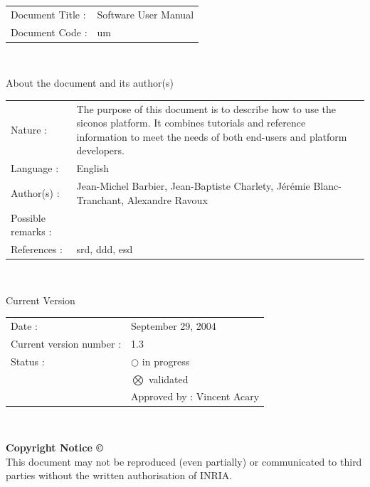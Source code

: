 \noindent\begin{tabular}{|p{}|p{}|}
\hline
Document Title : & \textsf{Software User Manual} \\
Document Code :  & \textsf{\acs{um}} \\
\hline
\end{tabular}
\textsf{ }\\


\begin{center}
  \textsf{\Large About the document and its author(s)}
\end{center}

\noindent\begin{tabular}{|p{}|p{}|}
\hline
Nature :& \textsf{The purpose of this document is to describe how to use the \acs{siconos} platform. It combines tutorials and reference information to meet the needs of both end-users and platform developers.}\\
Language :& \textsf{English}\\
Author(s) :& \textsf{Jean-Michel Barbier, Jean-Baptiste Charlety, J\'er\'emie Blanc-Tranchant, Alexandre Ravoux}\\
Possible remarks :& \textsf{}\\
References : &\textsf{\acs{srd}, \acs{ddd}, \acs{esd}}\\
\hline
\end{tabular}

\textsf{ }\\



\renewcommand{\arraystretch}{1.2}
\begin{center}
  \textsf{\Large Current Version}
\end{center}
\begin{tabular}{|p{}|p{}|}
\hline
Date : &\textsf{September 29, 2004}\\
Current version number : &\textsf{1.3}\\ 
Status :&$\bigcirc$ in progress \\
& $\bigotimes$ validated\\
\textit{ }& \hspace{0.5cm} Approved by : Vincent Acary\\
\hline
\end{tabular}


\textsf{ }\\
\begin{center}
\textbf{Copyright Notice \copyright}\\
This document may not be reproduced (even partially) or communicated to third parties without the written authorisation of INRIA.
\end{center}
\renewcommand{\arraystretch}{1.8}


